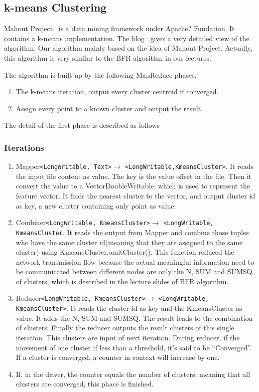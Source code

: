 \documentclass[a4paper,11pt]{article}
\begin{document}
\subsection{k-means Clustering}
Mahout Project~\cite{apache:mahout} is a data mining framework under Apache?
Fundation. It contains a k-means implementation. The blog~\cite{algo:kmeans3}
gives a very detailed view of the algorithm. Our algorithm mainly based on the
idea of Mahout Project. Actually, this algorithm is very similar to the BFR
algorithm in our lectures.

The algorithm is built up by the following MapReduce phases,
\begin{enumerate}
  \item The k-means iteration, output every cluster centroid if
  converged.  	
  \item Assign every point to a known cluster and output the result.
\end{enumerate}

The detail of the first phase is described as follows
\subsubsection{Iterations}
\begin{enumerate}
  \item Mapper\verb|<LongWritable, Text>|$\rightarrow$
  \verb|<LongWritable,KmeansCluster>|. It reads the input file content as value.
  The key is the value offset in the file. Then it convert the value to a
  VectorDoubleWritable, which is used to represent the feature vector. It finds
  the nearest cluster to the vector, and output cluster id as key, a new cluster
  containing only point as value.
  \item Combiner\verb|<LongWritable, KmeansCluster>|$\rightarrow$
  \verb|<LongWritable, KmeansCluster|. It reads the output from Mapper and
  combine those tuples who have the same cluster id(meaning that they are
  assigned to the same cluster) using KmeansCluster.omitCluster(). This function
  reduced the network transmission flow because the actual meaningful
  information need to be communicated between different nodes are only the N,
  SUM and SUMSQ of clusters, which is described in the lecture slides of BFR algorithm.
  \item Reducer\verb|<LongWritable, KmeansCluster>|$\rightarrow$
  \verb|<LongWritable, KmeansCluster>|. It reads the cluster id as key and the
  KmeansCluster as value. It adds the N, SUM and SUMSQ. The result leads to the
  combination of clusters. Finally the reducer outputs the result clusters of
  this single iteration. This clusters are input of next iteration. During
  reducer, if the movement of one cluster if less than a threshold, it's said
  to be ``Converged''. If a cluster is converged, a counter in context will
  increase by one.
  \item If, in the driver, the counter equals the number of clusters, meaning
  that all clusters are converged, this phase is finished.
\end{enumerate}
\end{document}
